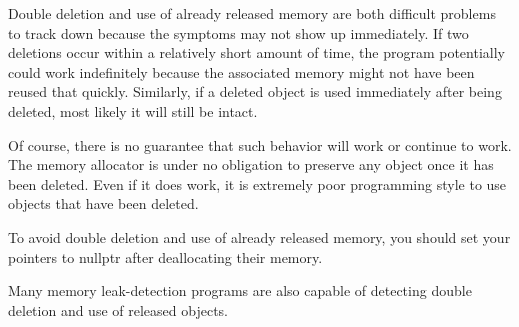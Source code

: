 Double deletion and use of already released memory are both difficult problems to track down because the symptoms may not show up immediately. If two deletions occur within a relatively short amount of time, the program potentially could work indefinitely because the associated memory might not have been reused that quickly. Similarly, if a deleted object is used immediately after being deleted, most likely it will still be intact.

Of course, there is no guarantee that such behavior will work or continue to work. The memory allocator is under no obligation to preserve any object once it has been deleted. Even if it does work, it is extremely poor programming style to use objects that have been deleted.

To avoid double deletion and use of already released memory, you should set your pointers to nullptr after deallocating their memory.

Many memory leak-detection programs are also capable of detecting double deletion and use of released objects.












